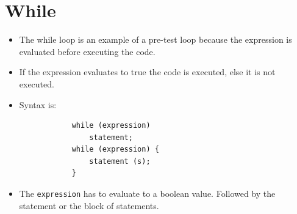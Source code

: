 \section{While}
\begin{itemize}
    \item The while loop is an example of a pre-test loop because the expression is evaluated before executing the code. 
    \item If the expression evaluates to true the code is executed, else it is not executed.
    \item Syntax is: 
        \begin{verbatim}
            while (expression) 
                statement;
            while (expression) {
                statement (s);
            }
        \end{verbatim}
    \item The \verb|expression| has to evaluate to a boolean value. Followed by the statement or the block of statements.
\end{itemize}

